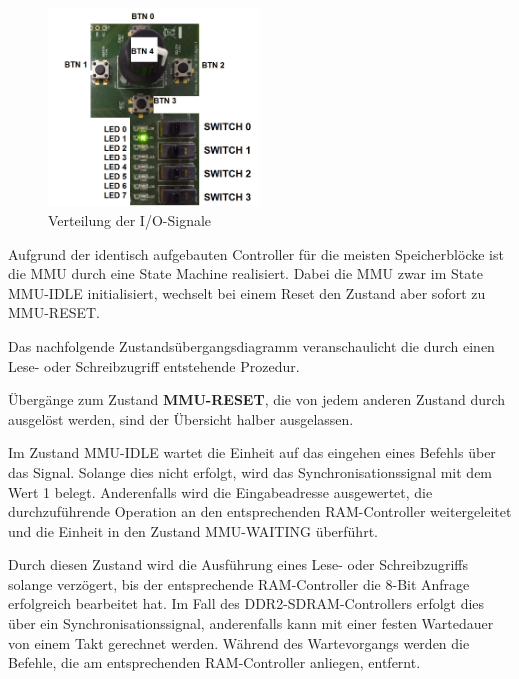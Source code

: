 \begin{figure}[H]
	\centering
	\label{fig:pinning}
		\includegraphics[width=0.5\textwidth]{pinning.png}
	\caption{Verteilung der I/O-Signale}
\end{figure}



Aufgrund der identisch aufgebauten Controller f\"ur die meisten Speicherbl\"ocke ist die MMU durch eine State Machine realisiert. Dabei die MMU zwar im State MMU-IDLE initialisiert, wechselt bei einem Reset den Zustand aber sofort zu MMU-RESET.

Das nachfolgende Zustands\"ubergangsdiagramm veranschaulicht die durch einen Lese- oder Schreibzugriff entstehende Prozedur.

{\"Uberg\"ange zum Zustand \textbf{MMU-RESET}, die von jedem anderen Zustand durch  ausgel\"ost werden, sind der \"Ubersicht halber ausgelassen.}


Im Zustand MMU-IDLE wartet die Einheit auf das eingehen eines Befehls \"uber das  Signal. Solange dies nicht erfolgt, wird das Synchronisationssignal  mit dem Wert 1 belegt. Anderenfalls wird die Eingabeadresse ausgewertet, die durchzuf\"uhrende Operation an den entsprechenden RAM-Controller weitergeleitet und die Einheit in den Zustand MMU-WAITING \"uberf\"uhrt.


Durch diesen Zustand wird die Ausf\"uhrung eines Lese- oder Schreibzugriffs solange verz\"ogert, bis der entsprechende RAM-Controller die 8-Bit Anfrage erfolgreich bearbeitet hat. Im Fall des DDR2-SDRAM-Controllers erfolgt dies \"uber ein Synchronisationssignal, anderenfalls kann mit einer festen Wartedauer von einem Takt gerechnet werden. W\"ahrend des Wartevorgangs werden die Befehle, die am entsprechenden RAM-Controller anliegen, entfernt.

